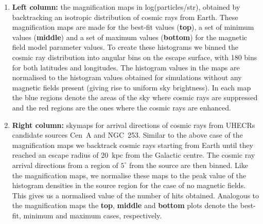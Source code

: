 \documentclass[usenatbib]{mnras}
\begin{document}
\begin{enumerate}
    \item {\bf Left column: } the magnification maps in log(particles/str), obtained by backtracking an isotropic distribution of cosmic rays from Earth. These magnification maps are made for the best-fit values (\textbf{top}), a set of minimum values (\textbf{middle}) and a set of maximum values (\textbf{bottom}) for the magnetic field model parameter values.
    To create these histograms we binned the cosmic ray distribution into angular bins on the escape surface, with 180 bins for both latitudes and longitudes. The histogram values in the maps are normalised to the histogram values obtained for simulations without any magnetic fields present (giving rise to uniform sky brightness). In each map the blue regions denote the areas of the sky where cosmic rays are suppressed and the red regions are the ones where the cosmic rays are enhanced.
    
    \item {\bf Right column: } skymaps for arrival directions
    of cosmic rays from UHECRs candidate sources Cen~A and NGC~253. Similar to the above case of the magnification maps we backtrack cosmic rays starting from Earth until they reached an escape radius of 20~kpc from the Galactic centre. The cosmic ray arrival directions from a region of $5^{\circ}$ from the source are then binned.  Like the magnification maps, we normalise these maps to the peak value of the histogram densities in the source region for the case of no magnetic fields.  This gives us a normalised value of the number of hits obtained. Analogous to the magnification maps the \textbf{top}, \textbf{middle} and \textbf{bottom} plots denote the best-fit, minimum and maximum cases, respectively. 
    \end{enumerate}
\end{document}

